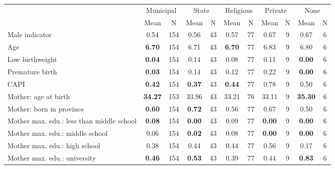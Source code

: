 \begin{tabular}{l c c c c c c c c c c}
\toprule
& \multicolumn{2}{c}{Municipal} & \multicolumn{2}{c}{State} & \multicolumn{2}{c}{Religious} & \multicolumn{2}{c}{Private} & \multicolumn{2}{c}{None} \\
& \scriptsize Mean & \scriptsize N & \scriptsize Mean & \scriptsize N & \scriptsize Mean & \scriptsize N & \scriptsize Mean & \scriptsize N & \scriptsize Mean & \scriptsize N \\
\midrule
Male indicator &      0.54 &       154 &      0.56 &        43 &      0.57 &        77 &      0.67 &         9 &      0.67 &         6 \\
Age & \textbf{     6.70} &       154 &      6.71 &        43 & \textbf{     6.70} &        77 &      6.83 &         9 &      6.80 &         6 \\
Low birthweight & \textbf{     0.04} &       154 &      0.14 &        43 &      0.08 &        77 &      0.11 &         9 & \textbf{     0.00} &         6 \\
Premature birth & \textbf{     0.03} &       154 &      0.14 &        43 &      0.12 &        77 &      0.22 &         9 & \textbf{     0.00} &         6 \\
CAPI & \textbf{     0.42} &       154 & \textbf{     0.37} &        43 & \textbf{     0.44} &        77 &      0.78 &         9 &      0.50 &         6 \\
Mother: age at birth & \textbf{    34.27} &       153 &     33.96 &        43 &     33.21 &        76 &     33.11 &         9 & \textbf{    35.30} &         6 \\
Mother: born in province & \textbf{     0.60} &       154 & \textbf{     0.72} &        43 &      0.56 &        77 &      0.67 &         9 &      0.50 &         6 \\
Mother max. edu.: less than middle school & \textbf{     0.08} &       154 & \textbf{     0.00} &        43 &      0.09 &        77 & \textbf{     0.00} &         9 & \textbf{     0.00} &         6 \\
Mother max. edu.: middle school &      0.06 &       154 & \textbf{     0.02} &        43 &      0.08 &        77 & \textbf{     0.00} &         9 & \textbf{     0.00} &         6 \\
Mother max. edu.: high school &      0.38 &       154 &      0.44 &        43 &      0.44 &        77 &      0.56 &         9 &      0.17 &         6 \\
Mother max. edu.: university & \textbf{     0.46} &       154 & \textbf{     0.53} &        43 &      0.39 &        77 &      0.44 &         9 & \textbf{     0.83} &         6 \\

\end{tabular}
